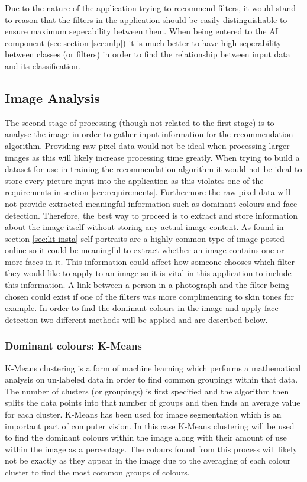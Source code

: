 \documentclass[a4paper,12pt]{report}
\begin{document}
        Due to the nature of the application trying to recommend filters, it would stand to reason that the filters in the application should be easily distinguishable to ensure maximum seperability between them. When being entered to the AI component (see section \ref{sec:mlp}) it is much better to have high seperability between classes (or filters) in order to find the relationship between input data and its classification.

      \subsection{Image Analysis}
        The second stage of processing (though not related to the first stage) is to analyse the image in order to gather input information for the recommendation algorithm. Providing raw pixel data would not be ideal when processing larger images as this will likely increase processing time greatly. When trying to build a dataset for use in training the recommendation algorithm it would not be ideal to store every picture input into the application as this violates one of the requirements in section \ref{sec:requirements}. Furthermore the raw pixel data will not provide extracted meaningful information such as dominant colours and face detection. Therefore, the best way to proceed is to extract and store information about the image itself without storing any actual image content. As found in section \ref{sec:lit-insta} self-portraits are a highly common type of image posted online so it could be meaningful to extract whether an image contains one or more faces in it. This information could affect how someone chooses which filter they would like to apply to an image so it is vital in this application to include this information. A link between a person in a photograph and the filter being chosen could exist if one of the filters was more complimenting to skin tones for example. In order to find the dominant colours in the image and apply face detection two different methods will be applied and are described below.

        \subsubsection{Dominant colours: K-Means} \label{sec:kmeans}
          K-Means clustering \citep{macqueen1967some} is a form of machine learning which performs a mathematical analysis on un-labeled data in order to find common groupings within that data. The number of clusters (or groupings) is first specified and the algorithm then splits the data points into that number of groups and then finds an average value for each cluster. K-Means has been used for image segmentation \citep{coleman1979image,shi2000normalized} which is an important part of computer vision. In this case K-Means clustering will be used to find the dominant colours within the image along with their amount of use within the image as a percentage. The colours found from this process will likely not be exactly as they appear in the image due to the averaging of each colour cluster to find the most common groups of colours.
\end{document}
